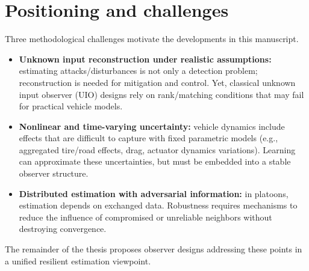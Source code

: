 
\section{Positioning and challenges}

Three methodological challenges motivate the developments in this manuscript.
\begin{itemize}
    \item \textbf{Unknown input reconstruction under realistic assumptions:} estimating attacks/disturbances is not only a detection problem; reconstruction is needed for mitigation and control. Yet, classical unknown input observer (UIO) designs rely on rank/matching conditions that may fail for practical vehicle models.
    \item \textbf{Nonlinear and time-varying uncertainty:} vehicle dynamics include effects that are difficult to capture with fixed parametric models (e.g., aggregated tire/road effects, drag, actuator dynamics variations). Learning can approximate these uncertainties, but must be embedded into a stable observer structure.
    \item \textbf{Distributed estimation with adversarial information:} in platoons, estimation depends on exchanged data. Robustness requires mechanisms to reduce the influence of compromised or unreliable neighbors without destroying convergence.
\end{itemize}

The remainder of the thesis proposes observer designs addressing these points in a unified resilient estimation viewpoint.




